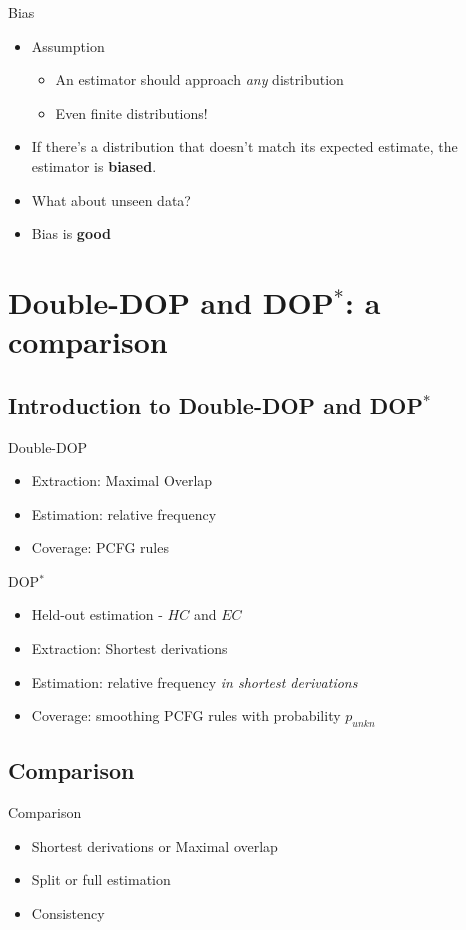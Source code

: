 \documentclass{beamer}
\newcommand{\dops}[0]{DOP$ ^*$}
\newcommand{\ddop}[0]{Double-DOP}
\begin{document}
\begin{frame}{Bias}

\begin{itemize}
\item Assumption
  \begin{itemize}
  \item An estimator should approach \emph{any} distribution
  \item Even finite distributions!
  \end{itemize}
\item If there's a distribution that doesn't match its expected estimate, the estimator is {\bf biased}.
\item What about unseen data?
\item Bias is {\bf good}
\end{itemize}
\end{frame}

\section{\ddop{} and \dops{}: a comparison}

\subsection{Introduction to \ddop{} and \dops{}}
\begin{frame}{\ddop{}}
\begin{itemize}
\item Extraction: Maximal Overlap
\item Estimation: relative frequency 
\item Coverage: PCFG rules
\end{itemize}
\end{frame}

\begin{frame}{\dops{}}
\begin{itemize}
\item Held-out estimation - $HC$ and $EC$
\item Extraction: Shortest derivations
\item Estimation: relative frequency \emph{in shortest derivations}
\item Coverage: smoothing PCFG rules with probability $p_{unkn}$
\end{itemize}
\end{frame}

\subsection{Comparison}
\begin{frame}{Comparison}
\begin{itemize}
\item Shortest derivations or Maximal overlap
\item Split or full estimation
\item Consistency
\end{itemize}
\end{frame}
\end{document}
